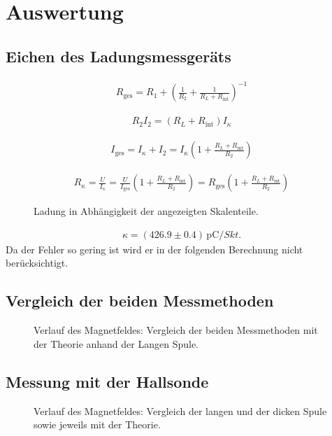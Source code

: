 \documentclass[12pt,a4paper,titlepage,headinclude,bibtotoc]{scrartcl}
\begin{document}
\section{Auswertung}
\label{sec:auswertung}
\subsection{Eichen des Ladungsmessgeräts}
\begin{align}
		R_\text{ges}=R_1+\left(\frac{1}{R_2}+\frac{1}{R_L+R_\text{int}}\right)^{-1}
\end{align}

\begin{align*}
	R_2 I_2=(R_L+R_\text{int})I_\kappa
\end{align*}

\begin{align*}
	I_\text{ges}=I_\kappa+I_2=I_\kappa\left(1+\frac{R_L+R_\text{int}}{R_2}\right)
\end{align*}

\begin{align}
	R_\kappa=\frac{U}{I_\kappa}=\frac{U}{I_\text{ges}}\left(1+\frac{R_L+R_\text{int}}{R_2}\right)=R_\text{ges}\left(1+\frac{R_L+R_\text{int}}{R_2}\right)
\end{align}

\begin{figure}[!htb]
	\centering
	
	\caption{Ladung in Abhängigkeit der angezeigten Skalenteile.}
	\label{fig:Eichen}
\end{figure}

\begin{align}
	\kappa=(426.9 \pm 0.4)\,\si{\pico\coulomb\per Skt.}
\end{align}
Da der Fehler so gering ist wird er in der folgenden Berechnung nicht berücksichtigt.
\subsection{Vergleich der beiden Messmethoden}
\begin{figure}[!htb]
	\centering
	
	\caption{Verlauf des Magnetfeldes: Vergleich der beiden Messmethoden mit der Theorie anhand der Langen Spule.}
	\label{fig:LangIndHall}
\end{figure}
\subsection{Messung mit der Hallsonde}
\begin{figure}[!htb]
	\centering
	
	\caption{Verlauf des Magnetfeldes: Vergleich der langen und der dicken Spule sowie jeweils mit der Theorie.}
	\label{fig:HallVergleich}
\end{figure}
\end{document}
